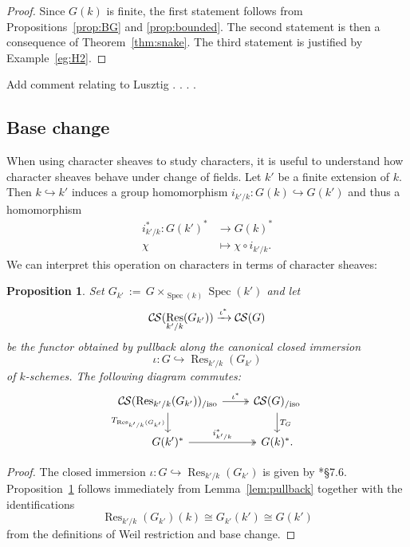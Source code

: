 \documentclass[10pt]{amsart}
\theoremstyle{plain}
\newtheorem{proposition}[theorem]{Proposition}
\theoremstyle{definition}
\theoremstyle{remark}
\newcommand{\Fq}{k}
\DeclareMathOperator{\Res}{Res}
\newcommand{\Spec}[1]{{\operatorname{Spec}(#1)}}
\newcommand{\ceq}{{\, :=\, }}
\newcommand{\TrFrob}[1]{T_{#1}}
\newcommand{\CS}{{\mathcal{C\hskip-0.8pt S}}}
\newcommand{\CSiso}[1]{\CS(#1)_{/\text{iso}}}
\begin{document}
\begin{proof}
Since $G(\Fq)$ is finite, the first statement follows from Propositions~\ref{prop:BG}
 and \ref{prop:bounded}. The second statement is then a consequence of Theorem~\ref{thm:snake}. 
 The third statement is justified by Example~\ref{eg:H2}.
 \end{proof}

Add comment relating to Lusztig . . . . 

\subsection{Base change}\label{ssec:basechange}

When using character sheaves to study characters, it is useful to understand
how character sheaves behave under change of fields.
Let $k'$ be a finite extension of $k$. Then $k \hookrightarrow k'$ induces a group homomorphism
$i_{k'/k} : G(k) \hookrightarrow G(k')$ and thus a homomorphism
\begin{align*}
i_{k'/k}^* : G(k')^* &\to G(k)^* \\
\chi &\mapsto \chi\circ i_{k'/k}.
\end{align*}
We can interpret this operation on characters in terms of character sheaves:

\begin{proposition} \label{prop:csbe}
Set $G_{k'} \ceq G\times_\Spec{k} \Spec{k'}$ and let
\[
\CS(\Res_{k'/k}(G_{k'})) \xrightarrow{\iota^*} \CS(G)
\]
be the functor obtained by pullback along the canonical closed immersion 
\[\iota : G \hookrightarrow \Res_{k'/k}(G_{k'})\] of $k$-schemes.
The following diagram commutes:
\[
\begin{tikzcd}
\CSiso{\Res_{k'/k}(G_{k'})} \arrow[two heads]{r}{\iota^*} \dar[swap]{\TrFrob{\Res_{k'/k}(G_{k'})}} & \CSiso{G} \dar{\TrFrob{G}} \\
G(k')^* \arrow[two heads]{r}{i_{k'/k}^*} & G(k)^*.
\end{tikzcd}
\]
\end{proposition}
\begin{proof}
The closed immersion $\iota : G \hookrightarrow \Res_{k'/k}(G_{k'})$ is given by \cite{bosch-lutkebohmert-reynaud:NeronModels}*{\S 7.6}.
Proposition~\ref{prop:csbe} follows immediately from Lemma~\ref{lem:pullback} together with the identifications
\[
\Res_{k'/k}(G_{k'})(k) \cong G_{k'}(k') \cong G(k')
\]
from the definitions of Weil restriction and base change.
\end{proof}
\end{document}
